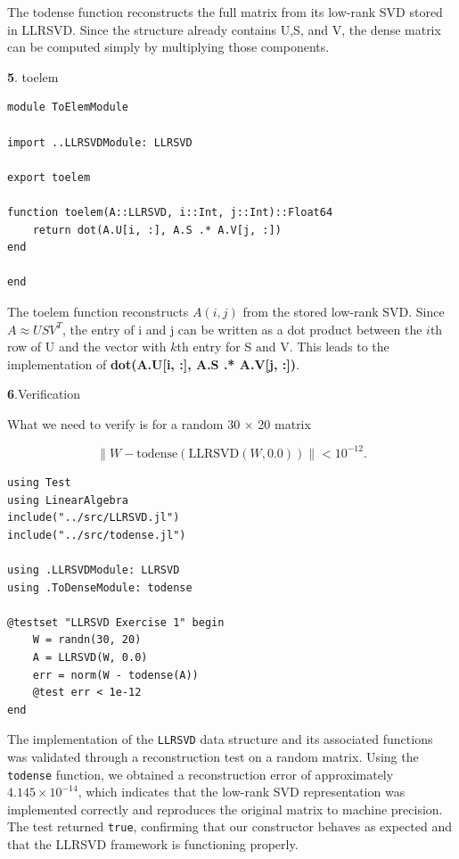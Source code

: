 \documentclass[11pt]{article}
\begin{document}
The todense function reconstructs the full matrix from its low-rank SVD stored in LLRSVD. Since the structure already contains U,S, and V, the dense matrix can be computed simply by multiplying those components.

\vspace{1.5em}

\textbf{5}. toelem

\begin{lstlisting}
module ToElemModule

import ..LLRSVDModule: LLRSVD

export toelem

function toelem(A::LLRSVD, i::Int, j::Int)::Float64
    return dot(A.U[i, :], A.S .* A.V[j, :])
end

end
\end{lstlisting}

The toelem function reconstructs $A(i,j)$ from the stored low-rank SVD. Since $A \approx USV^T$, the entry of i and j can be written as a dot product between the $i$th row of U and the vector with $k$th entry for S and V. This leads to the implementation of \textbf{dot(A.U[i, :], A.S .* A.V[j, :])}.
\vspace{1.5em}

\textbf{6}.Verification

What we need to verify is for a random 30 $\times$ 20 matrix 

\[
\| W - \text{todense}(\text{LLRSVD}(W, 0.0)) \| < 10^{-12}.
\]



\begin{lstlisting}
using Test
using LinearAlgebra
include("../src/LLRSVD.jl")
include("../src/todense.jl")

using .LLRSVDModule: LLRSVD
using .ToDenseModule: todense

@testset "LLRSVD Exercise 1" begin
    W = randn(30, 20)
    A = LLRSVD(W, 0.0)
    err = norm(W - todense(A))
    @test err < 1e-12
end
\end{lstlisting}

The implementation of the \texttt{LLRSVD} data structure and its associated
functions was validated through a reconstruction test on a random matrix.
Using the \texttt{todense} function, we obtained a reconstruction error of
approximately $4.145 \times 10^{-14}$, which indicates that the low-rank SVD
representation was implemented correctly and reproduces the original matrix to
machine precision. The test returned \texttt{true}, confirming that our
constructor behaves as expected and that the LLRSVD framework is functioning
properly.
\end{document}
